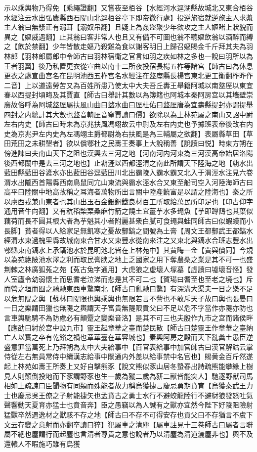 示以乘輿物乃得免【乘繩證翻】又嘗夜至栢谷【水經河水逕湖縣故城北又東合栢谷水經注云水出弘農縣西石隄山北逕栢谷亭下即帝微行處】投逆旅宿就逆旅主人求漿主人翁曰無漿正有溺耳【溺奴吊翻】且疑上為姦盜聚少年欲攻之主人嫗睹上狀貌而異之【嫗威遇翻】止其翁曰客非常人也且又有備不可圖也翁不聽嫗飲翁以酒醉而縛之【飲於禁翻】少年皆散走嫗乃殺雞為食以謝客明日上歸召嫗賜金千斤拜其夫為羽林郎【羽林郎屬郎中令師古曰羽林宿衛之官言如羽之疾如林之多也一說曰羽所以為王者羽翼】後乃私置更衣從宣曲以南十二所夜投宿長楊五柞等諸宫【師古曰為休息更衣之處宣曲宫名在昆明池西五柞宫名水經注在盩庢縣長楊宫東北更工衡翻柞昨作二音】上以道遠勞苦又為百姓所患乃使太中大夫吾丘夀王舉籍阿城以南盩厔以東宜春以西提封頃畮及其賈直【師古曰舉計其數以為簿籍也阿城本秦阿房宫以其墻壁崇廣故俗呼為阿城盩厔屬扶風山曲曰盩水曲曰厔杜佑曰盩厔唐為宜夀縣提封亦謂提舉四封之内總計其大數也盩音輈厔音窒賈讀曰價】欲除以為上林苑屬之南山又詔中尉左右内史【師古曰時未為京兆扶風馮翊故云中尉及左右内史也予據班表帝後改右内史為京兆尹左内史為左馮翊主爵都尉為右扶風是為三輔屬之欲翻】表屬縣草田【草田荒田之未耕墾者】欲以償鄠杜之民夀王奏事上大說稱善【說讀曰悦】時東方朔在傍進諫曰夫南山天下之阻也漢興去三河之地【河南河内河東為三河漢高帝始居洛陽後西都關中是去三河之地也】止覇滻以西都涇渭之南此所謂天下陸海之地【覇水出藍田縣藍田谷滻水亦出藍田谷逕藍田川北出霸陵入霸水霸又北入于渭涇水注見六卷渭水出隴西首陽縣西南鳥鼠同宂山東流與霸水涇水合又東至船司空入河陸海師古曰高平曰陸關中地高故稱之耳海者萬物所出言關中陸產饒富是以謂之陸海也】秦之所以虜西戎兼山東者也其山出玉石金銀銅鐵良材百工所取給萬民所卬足也【卬古仰字通用音牛向翻】又有秔稻棃栗桑麻竹箭之饒土宜薑芋水多䵷魚【芋即蹲䲭也其葉似藕荷而長不圓其根大者為芋魁其小者附麗甚衆白膩可食䵷與蛙同師古曰似蝦蟆而小長脚】貧者得以人給家足無飢寒之憂故酆鎬之間號為土膏【周文王都酆武王都鎬水經渭水東過槐里縣故城南東合甘水又東豐水從南來注之又東北與鎬水合班志豐水出鄠縣東南鎬水上承鎬池水於昆明池北皆在上林苑中】其賈畮一金【賈與價同】今規以為苑絶陂池水澤之利而取民膏腴之地上乏國家之用下奪農桑之業是其不可一也盛荆棘之林廣狐菟之苑【菟古兔字通用】大虎狼之虚壞人塜墓【虚讀曰墟壞音怪】發人室廬令幼弱懷土而思耆老泣涕而悲是其不可二也【賀瑒曰耆至也至老之境也】斥而營之垣而囿之騎馳東西車騖南北【師古曰亂馳曰騖】有深溝大渠夫一日之樂不足以危無隄之輿【蘇林曰隄限也輿乘輿也無限若言不訾也不敢斥天子故曰輿也張晏曰一日之樂謂田獵也無隄之輿謂天子富貴無隄限貢父曰不足以危不字當作亦隄亦防也言車輿馳騁不為防慮必有顛蹷之變樂音洛】是其不可三也夫殷作九市之宫而諸侯畔【應劭曰紂於宫中設九市】靈王起章華之臺而楚民散【師古曰楚靈王作章華之臺納亡人以實之卒有乾谿之禍也章華臺在華容城也】秦興阿房之殿而天下亂糞土愚臣逆盛意罪當萬死上乃拜朔為太中大夫給事中【百官表給事中加官師古曰漢官解詁云掌侍從左右無員常侍中續漢志給事中關通内外盖以給事禁中名官也】賜黄金百斤然遂起上林苑如夀王所奏上又好自擊熊豕【說文熊似豕山居冬蟄春出詩疏熊能攀緣上樹見人則顛倒投地而下豕謂野豕也生一歲為豵二歲為豜二獸皆能突人】馳逐野獸司馬相如上疏諫曰臣聞物有同類而殊能者故力稱烏獲捷言慶忌勇期賁育【烏獲秦武王力士也慶忌吳王僚之子射能捷矢也孟賁古之勇士水行不避蛟龍陸行不避豺狼發怒吐氣聲響動天夏育亦猛士也賁音奔】臣之愚竊以為人誠有之獸亦宜然今陛下好陵阻險射猛獸卒然遇逸材之獸駭不存之地【師古曰不存不可得安存也貢父曰不存猶言不虞下文云存變之意射而亦翻卒讀曰猝】犯屬車之清塵【屬車註見十三卷師古曰屬者言聨屬不絶也塵謂行而起塵也言清者尊貴之意也說者乃以清塵為清道灑塵非也】輿不及還轅人不暇施巧雖有烏獲